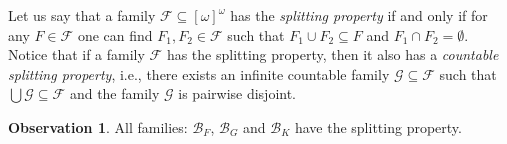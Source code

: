\documentclass{amsart}
\theoremstyle{definition}
\theoremstyle{definition}
\newtheorem{observation}{Observation}
\newcommand{\B}{\mathcal{B}}
\begin{document}
Let us say that a family $\mathcal{F} \subseteq [\omega]^\omega$ has the \emph{splitting property} if and only if for any $F \in \mathcal{F}$ one can find $F_1, F_2 \in \mathcal{F}$ such that $F_1 \cup F_2 \subseteq F$ and $F_1 \cap F_2 = \emptyset$. Notice that if a family $\mathcal{F}$ has the splitting property, then it also has a \emph{countable splitting property}, i.e., there exists an infinite countable family $\mathcal{G} \subseteq \mathcal{F}$ such that $\bigcup \mathcal{G} \subseteq \mathcal{F}$ and the family $\mathcal{G}$ is pairwise disjoint.


\begin{observation}
All families: $\B_F$, $\B_G$ and $\B_K$ have the splitting property.
\end{observation}
\end{document}

